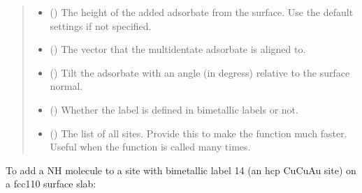 \documentclass[letterpaper,10pt,english]{sphinxmanual}
\begin{document}
\begin{fulllineitems}
\begin{quote}
\begin{description}
\begin{itemize}
\item {} 
 (\sphinxstyleliteralemphasis{\sphinxupquote{, }}) \textendash{} The height of the added adsorbate from the surface.
Use the default settings if not specified.

\item {} 
 (\sphinxstyleliteralemphasis{\sphinxupquote{, }}) \textendash{} The vector that the multidentate adsorbate is aligned to.

\item {} 
 (\sphinxstyleliteralemphasis{\sphinxupquote{, }}) \textendash{} Tilt the adsorbate with an angle (in degress) relative to
the surface normal.

\item {} 
 (\sphinxstyleliteralemphasis{\sphinxupquote{, }}) \textendash{} Whether the label is defined in bimetallic labels or not.

\item {} 
 (\sphinxstyleliteralemphasis{\sphinxupquote{, }}) \textendash{} The list of all sites. Provide this to make the function
much faster. Useful when the function is called many times.

\end{itemize}

\end{description}\end{quote}

\end{fulllineitems}



To add a NH molecule to a site with bimetallic label 14 (an hcp
CuCuAu site) on a fcc110 surface slab:
\end{document}
